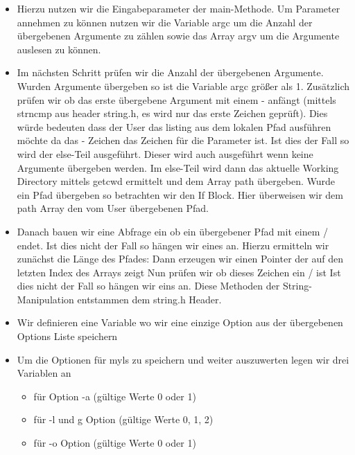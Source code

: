 \begin{itemize}
 \item Hierzu nutzen wir die Eingabeparameter der main-Methode.\newline
   Um Parameter annehmen zu können
 nutzen wir die Variable argc um die Anzahl der übergebenen Argumente
 zu zählen sowie das Array argv um die Argumente auslesen zu können.
\item Im nächsten Schritt prüfen wir die Anzahl der übergebenen
Argumente.
\newline
{}
\newline
Wurden Argumente übergeben so ist die Variable argc größer als 1.
Zusätzlich prüfen wir ob das erste übergebene Argument mit einem - anfängt
(mittels strncmp aus header string.h, es wird nur das erste Zeichen geprüft).
Dies würde bedeuten dass der User das listing aus dem lokalen Pfad ausführen
möchte da das - Zeichen das Zeichen für die Parameter ist.
Ist dies der Fall so wird der else-Teil ausgeführt. Dieser wird auch ausgeführt
wenn keine Argumente übergeben werden.
 Im else-Teil wird dann das aktuelle
Working Directory mittels getcwd ermittelt und dem Array path übergeben.
Wurde ein Pfad übergeben so betrachten wir den If Block.
 Hier überweisen wir dem path Array den vom
User übergebenen Pfad.
\item Danach bauen wir eine Abfrage ein ob ein übergebener Pfad mit einem
/ endet. Ist dies nicht der Fall so hängen wir eines an.
Hierzu ermitteln wir zunächst die Länge des Pfades:
Dann erzeugen wir einen Pointer der auf den letzten Index des Arrays
zeigt 
Nun prüfen wir ob dieses Zeichen ein / ist
Ist dies nicht der Fall so hängen wir eins an.
Diese Methoden der String-Manipulation entstammen dem string.h Header.
\item Wir definieren eine Variable  wo wir eine einzige Option
aus der übergebenen Options Liste speichern
\item Um die Optionen für myls zu speichern und weiter auszuwerten legen wir drei Variablen an
\begin{itemize}
	\item {} für Option -a (gültige Werte 0 oder 1)
	\item {} für -l und g Option (gültige Werte 0, 1, 2)
	\item {} für -o Option (gültige Werte 0 oder 1)
\end{itemize}


\end{itemize}
